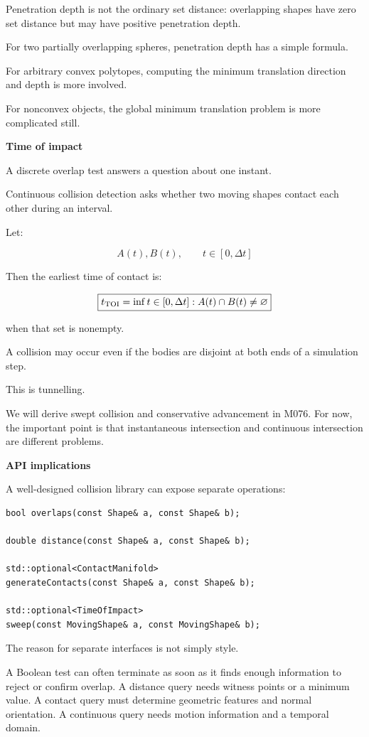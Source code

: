Penetration depth is not the ordinary set distance: overlapping shapes have zero set distance but may have positive penetration depth.

For two partially overlapping spheres, penetration depth has a simple formula.

For arbitrary convex polytopes, computing the minimum translation direction and depth is more involved.

For nonconvex objects, the global minimum translation problem is more complicated still.

\textbf{Time of impact}

A discrete overlap test answers a question about one instant.

Continuous collision detection asks whether two moving shapes contact each other during an interval.

Let:

\[
A(t),B(t),\qquad t\in[0,\Delta t]
\]

Then the earliest time of contact is:

\[
\boxed{ t_{\mathrm{TOI}}= \inf\\{t\in[0,\Delta t]:A(t)\cap B(t)\ne\varnothing\\} }
\]

when that set is nonempty.

A collision may occur even if the bodies are disjoint at both ends of a simulation step.

This is tunnelling.

We will derive swept collision and conservative advancement in M076. For now, the important point is that instantaneous intersection and continuous intersection are different problems.

\textbf{API implications}

A well-designed collision library can expose separate operations:

\begin{verbatim}
bool overlaps(const Shape& a, const Shape& b);

double distance(const Shape& a, const Shape& b);

std::optional<ContactManifold>
generateContacts(const Shape& a, const Shape& b);

std::optional<TimeOfImpact>
sweep(const MovingShape& a, const MovingShape& b);
\end{verbatim}

The reason for separate interfaces is not simply style.

A Boolean test can often terminate as soon as it finds enough information to reject or confirm overlap. A distance query needs witness points or a minimum value. A contact query must determine geometric features and normal orientation. A continuous query needs motion information and a temporal domain.

